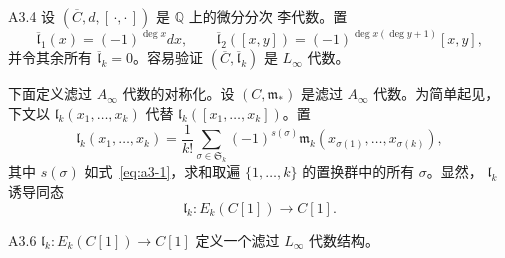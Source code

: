\begin{example}{A3.4}\label{ex:a3-4}
设 $(\overline C,d,[\,\cdot,\cdot\,])$ 是 $\mathbb Q$ 上的微分分次
李代数。置
\[
 \overline{\mathfrak l}_1(x)=(-1)^{\deg x}dx,\qquad
 \overline{\mathfrak l}_2([x,y])
 =(-1)^{\deg x(\deg y+1)}[x,y],
\]
并令其余所有 $\overline{\mathfrak l}_k=0$。容易验证
$(\overline C,\overline{\mathfrak l}_k)$ 是 $L_\infty$ 代数。
\end{example}

下面定义滤过 $A_\infty$ 代数的对称化。设
$(C,\mathfrak m_*)$ 是滤过 $A_\infty$ 代数。为简单起见，下文以
$\mathfrak l_k(x_1,\ldots,x_k)$ 代替
$\mathfrak l_k([x_1,\ldots,x_k])$。置
\begin{equation}
 \mathfrak l_k(x_1,\ldots,x_k)
 =\frac1{k!}\sum_{\sigma\in\mathfrak S_k}
 (-1)^{s(\sigma)}
 \mathfrak m_k(x_{\sigma(1)},\ldots,x_{\sigma(k)}),
 \tag{A3.5}\label{eq:a3-5}
\end{equation}
其中 $s(\sigma)$ 如式~\eqref{eq:a3-1}，求和取遍
$\{1,\ldots,k\}$ 的置换群中的所有 $\sigma$。显然，
$\mathfrak l_k$ 诱导同态
\[
 \mathfrak l_k\colon E_k(C[1])\longrightarrow C[1].
\]

\begin{proposition}{A3.6}\label{prop:a3-6}
$\mathfrak l_k\colon E_k(C[1])\to C[1]$ 定义一个滤过
$L_\infty$ 代数结构。
\end{proposition}

